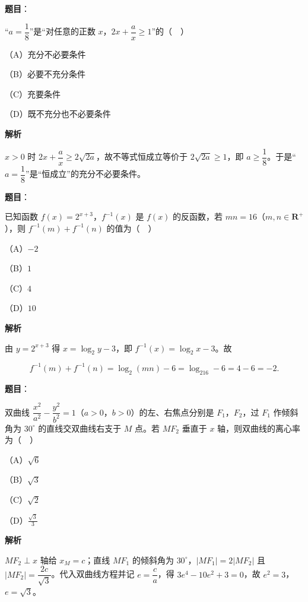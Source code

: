 \begin{answer}

\textbf{题目}：

“$a=\dfrac18$”是“对任意的正数 $x$，$2x+\dfrac ax\geqslant1$”的（　）

（A）充分不必要条件

（B）必要不充分条件

（C）充要条件

（D）既不充分也不必要条件

\textbf{解析}

$x>0$ 时 $2x+\dfrac ax\geqslant2\sqrt{2a}$，故不等式恒成立等价于 $2\sqrt{2a}\geqslant1$，即 $a\geqslant\dfrac18$。于是“$a=\dfrac18$”是“恒成立”的充分不必要条件。


\end{answer}
\begin{answer}

\textbf{题目}：

已知函数 $f(x)=2^{x+3}$，$f^{-1}(x)$ 是 $f(x)$ 的反函数，若 $mn=16$（$m,n\in\mathbf R^+$），则 $f^{-1}(m)+f^{-1}(n)$ 的值为（　）

（A）$-2$

（B）$1$

（C）$4$

（D）$10$

\textbf{解析}

由 $y=2^{x+3}$ 得 $x=\log_2y-3$，即 $f^{-1}(x)=\log_2x-3$。故

\nopagebreak[4]
\[f^{-1}(m)+f^{-1}(n)=\log_2(mn)-6=\log_216-6=4-6=-2.\]


\end{answer}
\begin{answer}

\textbf{题目}：

双曲线 $\dfrac{x^2}{a^2}-\dfrac{y^2}{b^2}=1$（$a>0$，$b>0$）的左、右焦点分别是 $F_1$，$F_2$，过 $F_1$ 作倾斜角为 $30^\circ$ 的直线交双曲线右支于 $M$ 点。若 $MF_2$ 垂直于 $x$ 轴，则双曲线的离心率为（　）

（A）$\sqrt6$

（B）$\sqrt3$

（C）$\sqrt2$

（D）$\frac{\sqrt3}3$

\textbf{解析}

$MF_2\perp x$ 轴给 $x_M=c$；直线 $MF_1$ 的倾斜角为 $30^\circ$，$|MF_1|=2|MF_2|$ 且 $|MF_2|=\dfrac{2c}{\sqrt3}$。代入双曲线方程并记 $e=\dfrac ca$，得 $3e^4-10e^2+3=0$，故 $e^2=3$，$e=\sqrt3$。


\end{answer}

